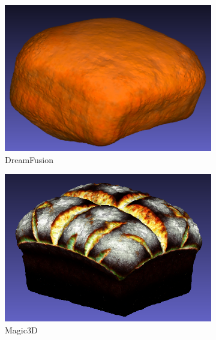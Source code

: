 \begin{figure}[ht]
    \centering
    \small
    \begin{subfigure}[b]{0.31\textwidth}
        \centering
        \includegraphics[width=\textwidth]{figures/subjective/dreamfusion_bread_result.png}
        \caption{DreamFusion}
        \vspace{0.1cm}
    \end{subfigure}
    \begin{subfigure}[b]{0.31\textwidth}
        \centering
        \includegraphics[width=\textwidth]{figures/subjective/magic3D_bread_result.png}
        \caption{Magic3D}
        \vspace{0.1cm}
    \end{subfigure}
    \begin{subfigure}[b]{0.2\textwidth}

\end{subfigure}
\end{figure}
